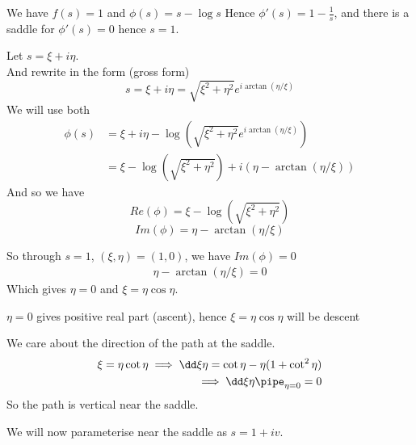\documentclass{X:/Documents/Coding/Latex/myassignment}
\begin{document}
We have $f(s) = 1$ and $\phi(s) = s-\log s$
Hence $\phi'(s) = 1-\frac1s$, and there is a saddle for $\phi'(s) = 0$ hence $s=1$.


Let $s = \xi+i\eta$.\\
And rewrite in the form (gross form) 
\[s = \xi + i\eta = \sqrt{\xi^2 + \eta^2} e^{i\arctan(\eta/\xi)}\]
We will use both
\begin{align*}
    \phi(s) &= \xi + i\eta - \log\left(\sqrt{\xi^2 + \eta^2} e^{i\arctan(\eta/\xi)}\right)\\
    &=\xi - \log \left(\sqrt{\xi^2 + \eta^2}\right) + i\left(\eta - \arctan(\eta/\xi)\right)
\end{align*}
And so we have 
\[Re(\phi) = \xi - \log(\sqrt{\xi^2+\eta^2})\]
\[Im(\phi) = \eta - \arctan(\eta/\xi)\]

So through $s=1$, $(\xi,\eta) = (1,0)$, we have $Im(\phi) = 0$
\begin{align*}
    \eta -\arctan(\eta/\xi) = 0
\end{align*}
Which gives $\eta = 0$ and $\xi = \eta \cos \eta$.

$\eta =0$ gives positive real part (ascent), hence $\xi = \eta\cos\eta$ will be descent

We care about the direction of the path at the saddle.
\begin{align*}
    \xi = \eta \cot \eta \implies \dd\xi\eta = \cot \eta - \eta(1+\cot^2\eta)\\
    \implies \dd\xi\eta\pipe_{\eta=0} = 0
\end{align*}
So the path is vertical near the saddle.

We will now parameterise near the saddle as $s=1+iv$.
\end{document}
